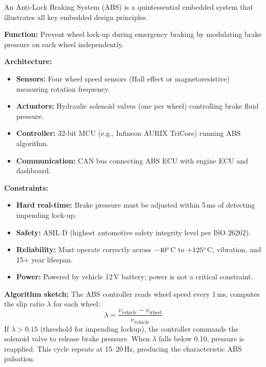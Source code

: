 \begin{example}
An Anti-Lock Braking System (ABS) is a quintessential embedded system that illustrates all key embedded design principles.

\textbf{Function:} Prevent wheel lock-up during emergency braking by modulating brake pressure on each wheel independently.

\textbf{Architecture:}
\begin{itemize}[nosep]
  \item \textbf{Sensors:} Four wheel speed sensors (Hall effect or magnetoresistive) measuring rotation frequency.
  \item \textbf{Actuators:} Hydraulic solenoid valves (one per wheel) controlling brake fluid pressure.
  \item \textbf{Controller:} 32-bit MCU (e.g., Infineon AURIX TriCore) running ABS algorithm.
  \item \textbf{Communication:} CAN bus connecting ABS ECU with engine ECU and dashboard.
\end{itemize}

\textbf{Constraints:}
\begin{itemize}[nosep]
  \item \textbf{Hard real-time:} Brake pressure must be adjusted within 5\,ms of detecting impending lock-up.
  \item \textbf{Safety:} ASIL D (highest automotive safety integrity level per ISO 26262).
  \item \textbf{Reliability:} Must operate correctly across $-40^\circ$C to $+125^\circ$C, vibration, and 15+ year lifespan.
  \item \textbf{Power:} Powered by vehicle 12\,V battery; power is not a critical constraint.
\end{itemize}

\textbf{Algorithm sketch:} The ABS controller reads wheel speed every 1\,ms, computes the slip ratio $\lambda$ for each wheel:
\[
  \lambda = \frac{v_{\text{vehicle}} - v_{\text{wheel}}}{v_{\text{vehicle}}}
\]
If $\lambda > 0.15$ (threshold for impending lockup), the controller commands the solenoid valve to release brake pressure. When $\lambda$ falls below 0.10, pressure is reapplied. This cycle repeats at 15--20\,Hz, producing the characteristic ABS pulsation.
\end{example}

